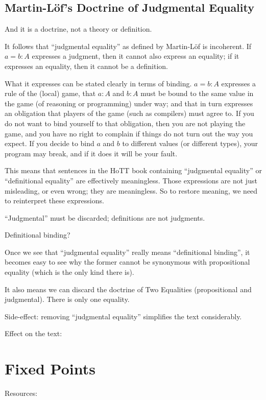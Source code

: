\documentclass{article}
\begin{document}
\subsection{Martin-Löf's Doctrine of Judgmental Equality}

And it is a doctrine, not a theory or definition.

It follows that ``judgmental equality'' as defined by Martin-Löf is
incoherent. If \(a=b:A\) expresses a judgment, then it cannot also
express an equality; if it expresses an equality, then it cannot be a
definition.

What it expresses can be stated clearly in terms of binding. \(a=b:A\)
expresses a rule of the (local) game, that \(a:A\) and \(b:A\) must be
bound to the same value in the game (of reasoning or programming)
under way; and that in turn expresses an obligation that players of
the game (such as compilers) must agree to. If you do not want to bind
yourself to that obligation, then you are not playing the game, and
you have no right to complain if things do not turn out the way you
expect. If you decide to bind \(a\) and \(b\) to different values (or
different types), your program may break, and if it does it will be
your fault.

This means that sentences in the HoTT book containing ``judgmental
equality'' or ``definitional equality'' are effectively meaningless.
Those expressions are not just misleading, or even wrong; they are
meaningless. So to restore meaning, we need to reinterpret these
expressions.

``Judgmental'' must be discarded; definitions are not judgments.

Definitional binding?

Once we see that ``judgmental equality'' really means ``definitional
binding'', it becomes easy to see why the former cannot be synonymous
with propositional equality (which is the only kind there is).

It also means we can discard the doctrine of Two Equalities
(propositional and judgmental). There is only one equality.

Side-effect: removing ``judgmental equality'' simplifies the text
considerably.

Effect on the text:


\section{Fixed Points}

Resources:
\end{document}
